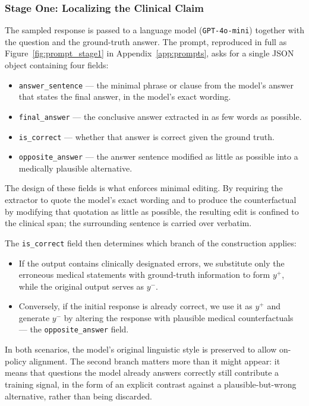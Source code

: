 \subsubsection{Stage One: Localizing the Clinical Claim}

The sampled response is passed to a language model (\texttt{GPT-4o-mini}) together with the question and the ground-truth answer. The prompt, reproduced in full as Figure~\ref{fig:prompt_stage1} in Appendix~\ref{app:prompts}, asks for a single JSON object containing four fields:

\begin{itemize}
    \item \texttt{answer\_sentence} --- the minimal phrase or clause from the model's answer that states the final answer, in the model's exact wording.
    \item \texttt{final\_answer} --- the conclusive answer extracted in as few words as possible.
    \item \texttt{is\_correct} --- whether that answer is correct given the ground truth.
    \item \texttt{opposite\_answer} --- the answer sentence modified as little as possible into a medically plausible alternative.
\end{itemize}

The design of these fields is what enforces minimal editing. By requiring the extractor to quote the model's exact wording and to produce the counterfactual by modifying that quotation as little as possible, the resulting edit is confined to the clinical span; the surrounding sentence is carried over verbatim.

The \texttt{is\_correct} field then determines which branch of the construction applies:

\begin{itemize}
    \item If the output contains clinically designated errors, we substitute only the erroneous medical statements with ground-truth information to form $y^+$, while the original output serves as $y^-$.
    \item Conversely, if the initial response is already correct, we use it as $y^+$ and generate $y^-$ by altering the response with plausible medical counterfactuals --- the \texttt{opposite\_answer} field.
\end{itemize}

In both scenarios, the model's original linguistic style is preserved to allow on-policy alignment. The second branch matters more than it might appear: it means that questions the model already answers correctly still contribute a training signal, in the form of an explicit contrast against a plausible-but-wrong alternative, rather than being discarded.

